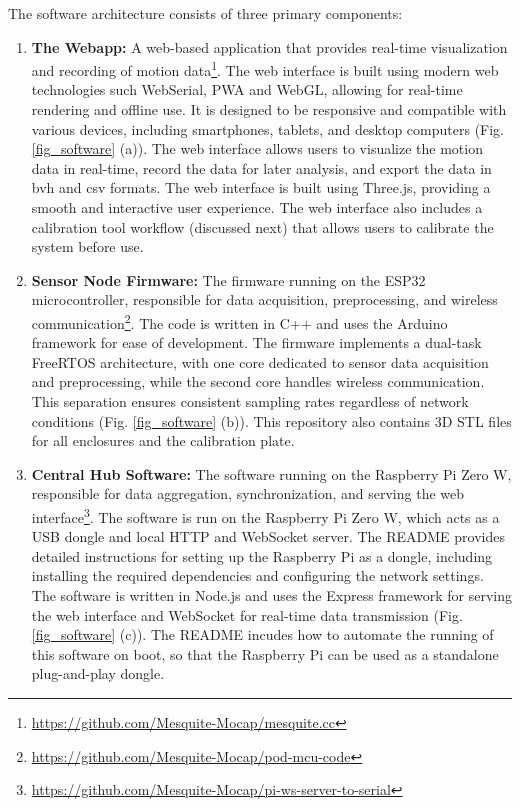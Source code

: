 \documentclass[lettersize,journal]{IEEEtran}
\begin{document}
The software architecture consists of three primary components: 
\begin{enumerate}[label=(\alph*)]
  \item \textbf{The Webapp:} A web-based application that provides real-time visualization and recording of motion data\footnote{\url{https://github.com/Mesquite-Mocap/mesquite.cc}}. The web interface is built using modern web technologies such WebSerial, PWA and WebGL, allowing for real-time rendering and offline use. It is designed to be responsive and compatible with various devices, including smartphones, tablets, and desktop computers (Fig. \ref{fig_software} (a)). The web interface allows users to visualize the motion data in real-time, record the data for later analysis, and export the data in bvh and csv formats. The web interface is built using Three.js, providing a smooth and interactive user experience. The web interface also includes a calibration tool workflow (discussed next) that allows users to calibrate the system before use.
  \item \textbf{Sensor Node Firmware:} The firmware running on the ESP32 microcontroller, responsible for data acquisition, preprocessing, and wireless communication\footnote{\url{https://github.com/Mesquite-Mocap/pod-mcu-code}}. The code is written in C++ and uses the Arduino framework for ease of development. The firmware implements a dual-task FreeRTOS architecture, with one core dedicated to sensor data acquisition and preprocessing, while the second core handles wireless communication. This separation ensures consistent sampling rates regardless of network conditions (Fig. \ref{fig_software} (b)). This repository also contains 3D STL files for all enclosures and the calibration plate.
  \item \textbf{Central Hub Software:} The software running on the Raspberry Pi Zero W, responsible for data aggregation, synchronization, and serving the web interface\footnote{\url{https://github.com/Mesquite-Mocap/pi-ws-server-to-serial}}. The software is run on the Raspberry Pi Zero W, which acts as a USB dongle and local HTTP and WebSocket server. The README provides detailed instructions for setting up the Raspberry Pi as a dongle, including installing the required dependencies and configuring the network settings. The software is written in Node.js and uses the Express framework for serving the web interface and WebSocket for real-time data transmission (Fig. \ref{fig_software} (c)). The README incudes how to automate the running of this software on boot, so that the Raspberry Pi can be used as a standalone plug-and-play dongle. 



\end{enumerate}
\end{document}
